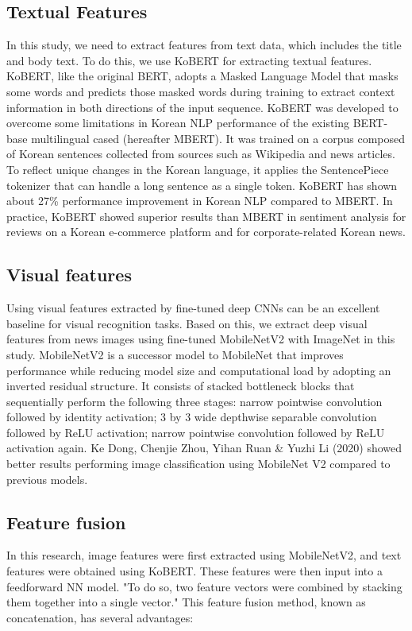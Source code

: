 \documentclass{article}
\begin{document}
\subsection{Textual Features}
In this study, we need to extract features from text data, which includes the title and body text. To do this, we use KoBERT for extracting textual features.
KoBERT, like the original BERT\cite{devlin2018bert}, adopts a Masked Language Model that masks some words and predicts those masked words during training to extract context information in both directions of the input sequence.
KoBERT was developed to overcome some limitations in Korean NLP performance of the existing BERT-base multilingual cased (hereafter MBERT). It was trained on a corpus composed of Korean sentences collected from sources such as Wikipedia and news articles.
To reflect unique changes in the Korean language, it applies the SentencePiece tokenizer that can handle a long sentence as a single token.
KoBERT has shown about 27\% performance improvement in Korean NLP compared to MBERT.
In practice, KoBERT showed superior results than MBERT in sentiment analysis for reviews on a Korean e-commerce platform and for corporate-related Korean news.




\subsection{Visual features}
Using visual features extracted by fine-tuned deep CNNs can be an excellent baseline for visual recognition tasks.\cite{sharif2014cnn} Based on this, we extract deep visual features from news images using fine-tuned MobileNetV2 with ImageNet in this study. MobileNetV2 is a successor model to MobileNet that improves performance while reducing model size and computational load by adopting an inverted residual structure. It consists of stacked bottleneck blocks that sequentially perform the following three stages: narrow pointwise convolution followed by identity activation; 3 by 3 wide depthwise separable convolution followed by ReLU activation; narrow pointwise convolution followed by ReLU activation again. Ke Dong, Chenjie Zhou, Yihan Ruan \& Yuzhi Li (2020) showed better results performing image classification using MobileNet V2 compared to previous models.\cite{dong2020mobilenetv2}



\subsection{Feature fusion}
In this research, image features were first extracted using MobileNetV2, and text features were obtained using KoBERT. These features were then input into a feedforward NN model. "To do so, two feature vectors were combined by stacking them together into a single vector."
This feature fusion method, known as concatenation, has several advantages:\\
\end{document}
